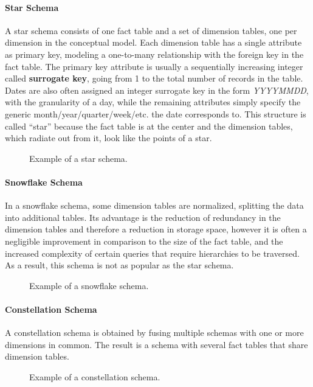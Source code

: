 \paragraph{Star Schema} A star schema consists of one fact table and a set of dimension tables, one per dimension in the conceptual model. Each dimension table has a single attribute as primary key, modeling a one-to-many relationship with the foreign key in the fact table. The primary key attribute is usually a sequentially increasing integer called \textbf{surrogate key}, going from 1 to the total number of records in the table. Dates are also often assigned an integer surrogate key in the form \textit{YYYYMMDD}, with the granularity of a day, while the remaining attributes simply specify the generic month/year/quarter/week/etc. the date corresponds to. This structure is called ``star'' because the fact table is at the center and the dimension tables, which radiate out from it, look like the points of a star.
\begin{figure}[ht]
    \centering
    
    \caption{Example of a star schema.}
\end{figure}

\paragraph{Snowflake Schema} In a snowflake schema, some dimension tables are normalized, splitting the data into additional tables. Its advantage is the reduction of redundancy in the dimension tables and therefore a reduction in storage space, however it is often a negligible improvement in comparison to the size of the fact table, and the increased complexity of certain queries that require hierarchies to be traversed. As a result, this schema is not as popular as the star schema.
\begin{figure}[ht]
    \centering
    
    \caption{Example of a snowflake schema.}
\end{figure}

\paragraph{Constellation Schema} A constellation schema is obtained by fusing multiple schemas with one or more dimensions in common. The result is a schema with several fact tables that share dimension tables.
\begin{figure}[ht]
    \centering
    
    \caption{Example of a constellation schema.}
\end{figure}